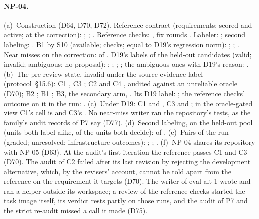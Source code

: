 \paragraph{NP-04.}
(a)~Construction (D64, D70, D72). Reference contract (requirements; scored and active; at the correction):
; ; . Reference checks:
, fix rounds . Labeler: ; second labeling:
. B1 by S10 (available; checks; equal to D19's regression norm): ;
; . Near misses on the correction:  of
. D19's labels of the held-out candidates (valid; invalid; ambiguous; no proposal):
; ; ; ; the ambiguous ones
with D19's reason: .
(b)~The pre-review state, invalid under the source-evidence label (protocol~\S15.6): C1 , C3
; C2  and C4 , audited against an unreliable oracle (D70); B2
; B1 ; B3, the secondary arm, . Its D19 label: ; the
reference checks' outcome on it in the run: .
(c)~Under D19: C1  and , C3  and ; in the oracle-gated
view C1's cell is  and C3's . No near-miss writer ran the repository's tests, as the
family's audit records of P7 say (D77).
(d)~Second labeling, on the held-out pool (units both label alike, of the units both decide): 
of .
(e)~Pairs of the run (graded; unresolved; infrastructure outcomes): ; ;
.
(f)~NP-04 shares its repository with NP-05 (D63). At the audit's first iteration the reference passes C1 and C3 (D70).
The audit of C2 failed after its last revision by rejecting the development alternative, which, by the revisers'
account, cannot be told apart from the reference on the requirement it targets (D70). The writer of eval-alt-1 wrote and
ran a helper outside its workspace; a review of the reference checks started the task image itself, its verdict rests
partly on those runs, and the audit of P7 and the strict re-audit missed a call it made (D75).

